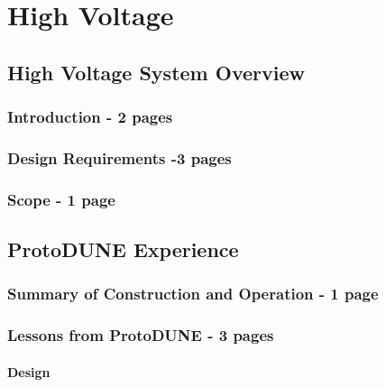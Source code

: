 \chapter{High Voltage}
\label{ch:sp-hv}

\section{High Voltage System Overview}
\label{sec:fdsp-hv-ov}

\subsection{Introduction - 2 pages}
\label{sec:fdsp-hv-intro}

\subsection{Design Requirements -3 pages}
\label{sec:fdsp-hv-des-consid}

\subsection{Scope - 1 page }
\label{sec:fdsp-hv-scope}


\clearpage
\section{ProtoDUNE Experience}
\label{sec:fdsp-hv-protodune}
\subsection{Summary of Construction and Operation - 1 page }
\label{sec:fdsp-hv-protodune-summary}

\subsection{Lessons from ProtoDUNE - 3 pages}
\label{sec:fdsp-hv-protodune-lessons}

\subsubsection{Design}
\label{sec:fdsp-hv-protodune-lessons-design}
